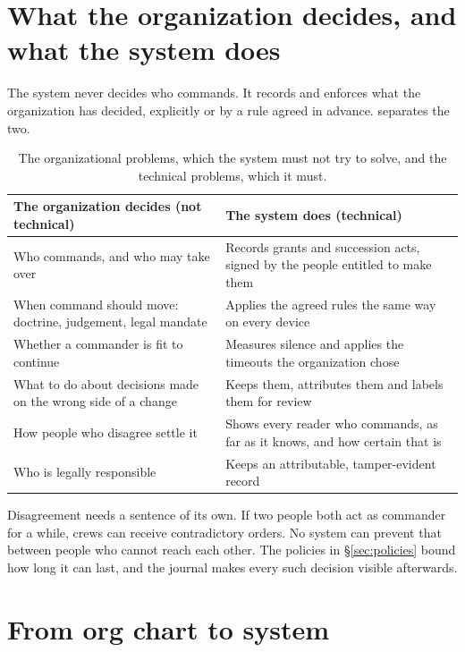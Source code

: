 \documentclass[11pt,a4paper]{article}
\begin{document}
\section{What the organization decides, and what the system does}
\label{sec:split}

The system never decides who commands. It records and enforces what the organization has
decided, explicitly or by a rule agreed in advance.  separates the two.

\begin{table}[htbp]
\centering
\caption{The organizational problems, which the system must not try to solve, and the
technical problems, which it must.}
\label{tab:split}
\small
\begin{tabularx}{\linewidth}{@{}LL@{}}
\toprule
\textbf{The organization decides (not technical)} & \textbf{The system does (technical)} \\
\midrule
Who commands, and who may take over & Records grants and succession acts, signed by the
  people entitled to make them \\
When command should move: doctrine, judgement, legal mandate & Applies the agreed rules the
  same way on every device \\
Whether a commander is fit to continue & Measures silence and applies the timeouts the
  organization chose \\
What to do about decisions made on the wrong side of a change & Keeps them, attributes them
  and labels them for review \\
How people who disagree settle it & Shows every reader who commands, as far as it knows, and
  how certain that is \\
Who is legally responsible & Keeps an attributable, tamper-evident record \\
\bottomrule
\end{tabularx}
\end{table}

Disagreement needs a sentence of its own. If two people both act as commander for a while,
crews can receive contradictory orders. No system can prevent that between people who
cannot reach each other. The policies in \S\ref{sec:policies} bound how long it can last,
and the journal makes every such decision visible afterwards.

\section{From org chart to system}
\label{sec:translation}
\end{document}
